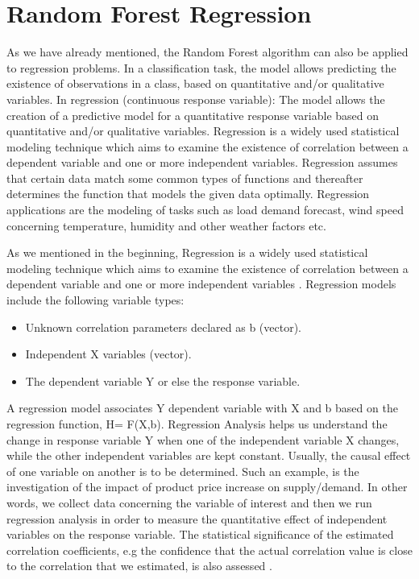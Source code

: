 \section{Random Forest Regression}
As we have already mentioned, the Random Forest algorithm can also be applied to regression problems. In a classification task, the model allows predicting the existence of observations in a class, based on quantitative and/or qualitative variables. In regression (continuous response variable): The model allows the creation of a predictive model for a quantitative response variable based on quantitative and/or qualitative variables. Regression is a widely used statistical modeling technique which aims to examine the existence of correlation between a dependent variable and one or more independent variables. Regression assumes that certain data match some common types of functions and thereafter determines the function that models the given data optimally. Regression applications are the modeling of tasks such as load demand forecast, wind speed concerning temperature, humidity and other weather factors etc.
\par As we mentioned in the beginning, Regression is a widely used statistical modeling technique which aims to examine the existence of correlation between a dependent variable and one or more independent variables \cite{liaw2002classification}. Regression models include the following variable types:
\begin{itemize}
    \item Unknown correlation parameters declared as b (vector).
    \item Independent X variables (vector).
    \item The dependent variable Y or else the response variable.
\end{itemize}
A regression model associates Y dependent variable with X and b based on the regression function, H= F(X,b). Regression Analysis helps us understand the change in response variable Y when one of the independent variable X changes, while the other independent variables are kept constant. Usually, the causal effect of one variable on another is to be determined. Such an example, is the investigation of the impact of product price increase on supply/demand. In other words, we collect data concerning the variable of interest and then we run regression analysis in order to measure the quantitative effect of independent variables on the response variable. The statistical significance of the estimated correlation coefficients, e.g the confidence that the actual correlation value is close to the correlation that we estimated, is also assessed \cite{rfr}.
